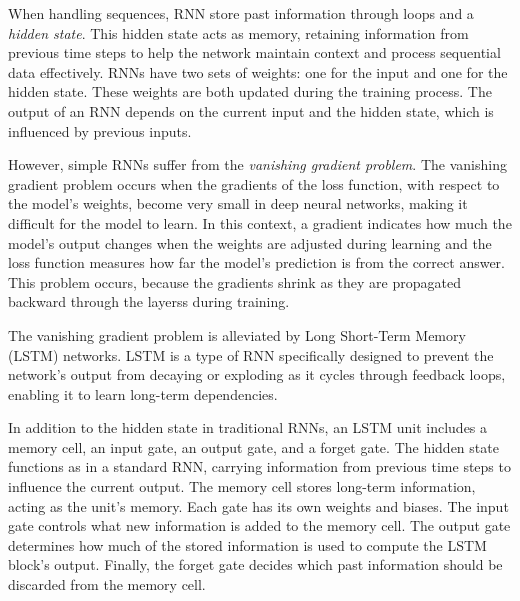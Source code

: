 \documentclass[a4paper,oneside,onecolumn,12pt]{book}
\begin{document}
		When handling sequences, RNN store past information through loops and a \textit{hidden state}. This hidden state acts as memory, retaining information from previous time steps to help the network maintain context and process sequential data effectively. RNNs have two sets of weights: one for the input and one for the hidden state. These weights are both updated during the training process. The output of an RNN depends on the current input and the hidden state, which is influenced by previous inputs. \cite{HLSTMW}

		However, simple RNNs suffer from the \textit{vanishing gradient problem}. The vanishing gradient problem occurs when the gradients of the loss function, with respect to the model's weights, become very small in deep neural networks, making it difficult for the model to learn. In this context, a gradient indicates how much the model's output changes when the weights are adjusted during learning and the loss function measures how far the model's prediction is from the correct answer. This problem occurs, because the gradients shrink as they are propagated backward through the layerss during training. \cite{VGPCCS}

		The vanishing gradient problem is alleviated by Long Short-Term Memory (LSTM) networks. LSTM is a type of RNN specifically designed to prevent the network’s output from decaying or exploding as it cycles through feedback loops, enabling it to learn long-term dependencies. \cite{LSTM}

		In addition to the hidden state in traditional RNNs, an LSTM unit includes a memory cell, an input gate, an output gate, and a forget gate. The hidden state functions as in a standard RNN, carrying information from previous time steps to influence the current output. The memory cell stores long-term information, acting as the unit's memory. Each gate has its own weights and biases. The input gate controls what new information is added to the memory cell. The output gate determines how much of the stored information is used to compute the LSTM block’s output. Finally, the forget gate decides which past information should be discarded from the memory cell.  \cite{HLSTMW} 
		
\end{document}
